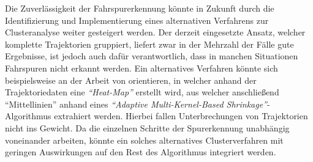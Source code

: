 Die Zuverlässigkeit der Fahrspurerkennung könnte in Zukunft durch die Identifizierung und Implementierung
eines alternativen Verfahrens zur Clusteranalyse weiter gesteigert werden.
Der derzeit eingesetzte Ansatz, welcher komplette Trajektorien gruppiert, liefert zwar in der Mehrzahl der Fälle
gute Ergebnisse, ist jedoch auch dafür verantwortlich, dass in manchen Situationen Fahrspuren nicht erkannt werden.
Ein alternatives Verfahren könnte sich beispielsweise an der Arbeit von \cite[]{Xu2015} orientieren, in welcher
anhand der Trajektoriedaten eine \textit{``Heat-Map''} erstellt wird, aus welcher anschließend ``Mittellinien''
anhand eines \textit{``Adaptive Multi-Kernel-Based Shrinkage''}-Algorithmus extrahiert werden.
Hierbei fallen Unterbrechungen von Trajektorien nicht ins Gewicht.
Da die einzelnen Schritte der Spurerkennung unabhängig voneinander arbeiten, könnte ein
solches alternatives Clusterverfahren mit geringen Auswirkungen auf den Rest des Algorithmus integriert werden.